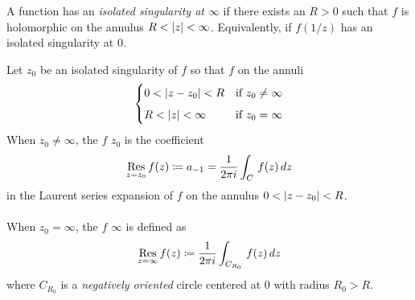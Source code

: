 \begin{definition}
A function has an \emph{isolated singularity at $\infty$} if there exists an $R > 0$ such that $f$ is holomorphic on the annulus $R < \left\lvert z\right\rvert < \infty$. Equivalently, if $f(1/z)$ has an isolated singularity at $0$.
\end{definition}

\vspace*{1em}

\begin{definition}[Residues]
Let $z_0$ be an isolated singularity of $f$ so that $f$ on the annuli
\[\begin{cases}0 < \left\lvert z - z_0\right\rvert < R & \text{if } z_0 \neq \infty\\[0.5em] R < \left\lvert z\right\rvert < \infty & \text{if } z_0 = \infty \end{cases}\]
When $z_0 \neq \infty$, the  {\color{blue}$f$}  {\color{blue}$z_0$} is the coefficient
\[\underset{z = {z_0}}{\operatorname{Res}}\,f(z) \coloneqq a_{-1} = \frac{1}{2\pi i}\int_C\,f(z)\,dz\]
in the Laurent series expansion of $f$ on the annulus $0 < \left\lvert z - z_0\right\rvert < R$.\\
\\
When $z_0 = \infty$, the  {\color{blue}$f$}  {\color{blue}$\infty$} is defined as
\[\underset{z = {\infty}}{\operatorname{Res}}\,f(z) \coloneqq \frac{1}{2\pi i}\int_{C_{R_0}}\,f(z)\,dz\]
where $C_{R_0}$ is a \emph{negatively oriented} circle centered at $0$ with radius $R_0 > R$.
\end{definition}

\vspace*{1em}

